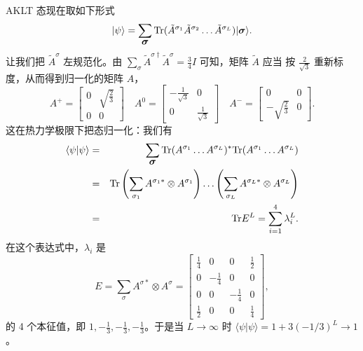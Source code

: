 \documentclass[a4paper,10pt,oneside,onecolumn,1p,times]{elsarticle}
\newcommand{\tr}{{\rm Tr }}
\newcommand{\ket}[1]{\mbox{$| #1  \rangle$}}
\newcommand{\braket}[2]{\mbox{$\langle #1  | #2 \rangle$}} 	%
\newcommand{\fat}[1]{\mbox{\boldmath$#1$\unboldmath}}	%
\newcommand{\syslength}{L}
\begin{document}
AKLT 态现在取如下形式
\begin{equation}
    \ket{\psi} = \sum_{\fat{\sigma}} \tr (\tilde{A}^{\sigma_{1}} 
    \tilde{A}^{\sigma_{2}} \ldots \tilde{A}^{\sigma_{\syslength}}) \ket{\fat{\sigma}} .
    \label{eq:akltstate}
\end{equation}
让我们把 $\tilde{A}^\sigma$ 左规范化。由 $\sum_\sigma \tilde{A}^{\sigma\dagger}\tilde{A}^\sigma = \frac{3}{4}I$ 可知，矩阵 $\tilde{A}$  应当
按 $\frac{2}{\sqrt{3}}$ 重新标度，从而得到归一化的矩阵 $A$，
\begin{equation}
    A^+ = \left[ \begin{array}{cc} 0 & \sqrt{\frac{2}{3}} \\ 0 & 0 \end{array} \right] \quad
    A^0 = \left[ \begin{array}{cc} -\frac{1}{\sqrt{3}} & 0 \\ 
    0 & \frac{1}{\sqrt{3}} \end{array} \right] \quad
    A^- = \left[ \begin{array}{cc} 0 & 0 \\ -\sqrt{\frac{2}{3}} & 0 \end{array} \right] .
    \label{eq:normalizeda}
\end{equation}
这在热力学极限下把态归一化：我们有
\begin{eqnarray*}
\braket{\psi}{\psi} &=& \sum_{\fat{\sigma}} \tr (A^{\sigma_1} \ldots A^{\sigma_\syslength})^* \tr (A^{\sigma_1} \ldots A^{\sigma_\syslength}) \\
&=&  \tr \left( \sum_{\sigma_1} A^{\sigma_1*} \otimes A^{\sigma_1}\right) \ldots \left( \sum_{\sigma_L} A^{\sigma_\syslength*}\otimes A^{\sigma_\syslength} \right) \\
&=& \tr E^L = \sum_{i=1}^4 \lambda_i^L .
\end{eqnarray*}
在这个表达式中，$\lambda_i$ 是
\begin{equation}
E = \sum_\sigma A^{\sigma*} \otimes A^{\sigma} = \left[ \begin{array}{cccc} 
\frac{1}{4} & 0 & 0 & \frac{1}{2} \\
0 & -\frac{1}{4} & 0 & 0 \\
0 & 0 & -\frac{1}{4} & 0 \\
\frac{1}{2} & 0 & 0 & \frac{1}{4}
\end{array} \right] ,
\end{equation}
的 4 个本征值，即 $1,-\frac{1}{3},-\frac{1}{3},-\frac{1}{3}$。于是当 $L\rightarrow\infty$ 时 $\braket{\psi}{\psi} = 1 + 3(-1/3)^L \rightarrow 1$。
\end{document}
